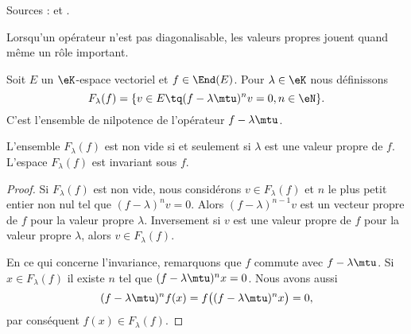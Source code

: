 Sources : \cite{MneimneReduct} et .

Lorsqu'un opérateur n'est pas diagonalisable, les valeurs propres jouent quand même un rôle important.

Soit \( E\) un \( \eK\)-espace vectoriel et \( f\in\End(E)\). Pour \( \lambda\in \eK\) nous définissons
\begin{equation}
    F_{\lambda}(f)=\{ v\in E\tq (f-\lambda\mtu)^nv=0, n\in\eN \}.
\end{equation}
C'est l'ensemble de nilpotence de l'opérateur \( f-\lambda\mtu\).

\begin{lemma}
    L'ensemble \( F_{\lambda}(f)\) est non vide si et seulement si \( \lambda\) est une valeur propre de \( f\). L'espace \( F_{\lambda}(f)\) est invariant sous \( f\).
\end{lemma}

\begin{proof}
    Si \( F_{\lambda}(f)\) est non vide, nous considérons \( v\in F_{\lambda}(f)\) et \( n\) le plus petit entier non nul tel que \( (f-\lambda)^nv=0\). Alors \( (f-\lambda)^{n-1}v\) est un vecteur propre de \( f\) pour la valeur propre \( \lambda\). Inversement si \( v\) est une valeur propre de \( f\) pour la valeur propre \( \lambda\), alors \( v\in F_{\lambda}(f)\).

    En ce qui concerne l'invariance, remarquons que \( f\) commute avec \( f-\lambda\mtu\). Si \( x\in F_{\lambda}(f)\) il existe \( n\) tel que \( (f-\lambda\mtu)^nx=0\). Nous avons aussi
    \begin{equation}
        (f-\lambda\mtu)^nf(x)=f\big( (f-\lambda\mtu)^nx \big)=0,
    \end{equation}
    par conséquent \( f(x)\in F_{\lambda}(f)\).
\end{proof}


